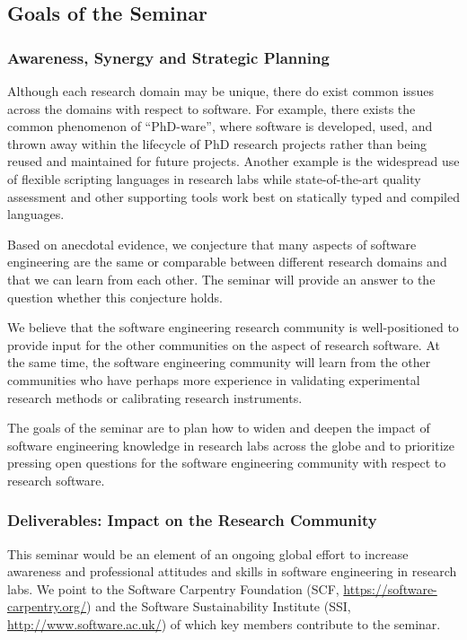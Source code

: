 \documentclass[a4paper,UKenglish]{dagman}
\renewcommand{\paragraph}[1]{\subsubsection*{#1}\xspace}
\begin{document}
\subsection*{Goals of the Seminar}

\paragraph{Awareness, Synergy and Strategic Planning}

Although each research domain may be unique, there do exist common issues across the domains with respect to software. For example, there exists the common phenomenon of ``PhD-ware'', where software is developed, used, and thrown away within the lifecycle of PhD research projects rather than being reused and maintained for future projects. Another example is the widespread use of flexible scripting languages in research labs while state-of-the-art quality assessment and other supporting tools work best on statically typed and compiled languages.

Based on anecdotal evidence, we conjecture that many aspects of software engineering are the same or comparable between different research domains and that we can learn from each other. The seminar will provide an answer to the question whether this conjecture holds.

We believe that the software engineering research community is well-positioned to provide input for the other communities on the aspect of research software. At the same time, the software engineering community will learn from the other communities who have perhaps more experience in validating experimental research methods or calibrating research instruments. 

The goals of the seminar are to plan how to widen and deepen the impact of software engineering knowledge in research labs across the globe and to prioritize pressing open questions for the software engineering community with respect to research software.

\paragraph{Deliverables: Impact on the Research Community}

This seminar would be an element of an ongoing global effort to increase awareness and professional attitudes and skills in software engineering in research labs. We point to the Software Carpentry Foundation (SCF, \url{https://software-carpentry.org/}) and the Software Sustainability Institute (SSI, \url{http://www.software.ac.uk/}) of which key members contribute to the seminar.
\end{document}
